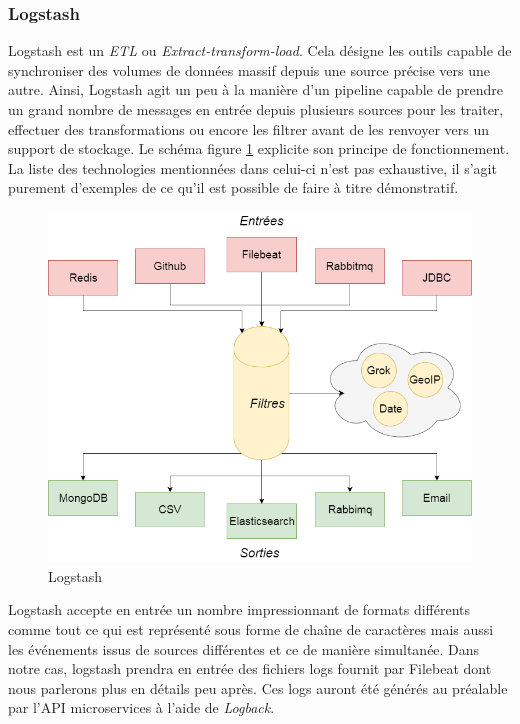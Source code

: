 	\subsubsection{Logstash}
	Logstash est un \textit{ETL} ou \textit{Extract-transform-load}. Cela désigne les outils capable de synchroniser des volumes de données massif depuis une source précise vers une autre. Ainsi, Logstash agit un peu à la manière d'un pipeline capable de prendre un grand nombre de messages en entrée depuis plusieurs sources pour les traiter, effectuer des transformations ou encore les filtrer avant de les renvoyer vers un support de stockage. Le schéma figure \ref{logstash} explicite son principe de fonctionnement. La liste des technologies mentionnées dans celui-ci n'est pas exhaustive, il s'agit purement d'exemples de ce qu'il est possible de faire à titre démonstratif. \\
	
	\begin{figure}[h!]
		\includegraphics[scale=0.4]{images/travailNeuflizeOBC/dashboard/logstash.png}
		\centering
		\caption{Logstash}
		\label{logstash}
	\end{figure}
	
	Logstash accepte en entrée un nombre impressionnant de formats différents comme tout ce qui est représenté sous forme de chaîne de caractères mais aussi les événements issus de sources différentes et ce de manière simultanée. Dans notre cas, logstash prendra en entrée des fichiers logs fournit par Filebeat dont nous parlerons plus en détails peu après. Ces logs auront été générés au préalable par l'API microservices à l'aide de \textit{Logback}. \\
	
